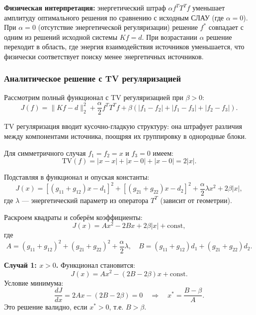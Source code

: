 \documentclass[a4paper,14pt,oneside,openany]{extarticle}
\begin{document}
\textbf{Физическая интерпретация:} энергетический штраф $\alpha f^T T^T f$ уменьшает амплитуду оптимального решения по сравнению с исходным СЛАУ (где $\alpha=0$). 
При $\alpha=0$ (отсутствие энергетической регуляризации) решение $f^*$ совпадает с одним из решений исходной системы $Kf = d$.
При возрастании $\alpha$ решение переходит в область, где энергия взаимодействия источников уменьшается, что физически соответствует поиску менее энергетичных источников.

\subsubsection{Аналитическое решение с TV регуляризацией}

Рассмотрим полный функционал с TV регуляризацией при $\beta > 0$:
\begin{equation}
    J(f) = \|Kf-d\|_2^2 + \frac{\alpha}{2}f^T T^T f + \beta (|f_1-f_2| + |f_1-f_3| + |f_2-f_3|).
\end{equation}

TV регуляризация вводит кусочно-гладкую структуру: она штрафует различия между компонентами источника, поощряя их группировку в однородные блоки.

Для симметричного случая $f_1 = f_2 = x$ и $f_3 = 0$ имеем:
\begin{equation}
    \mathrm{TV}(f) = |x-x| + |x-0| + |x-0| = 2|x|.
\end{equation}

Подставляя в функционал и опуская константы:
\begin{equation}
    J(x) = \left[(g_{11}+g_{12})x - d_1\right]^2 + \left[(g_{21}+g_{22})x - d_2\right]^2 + \frac{\alpha}{2} \lambda x^2 + 2\beta|x|,
\end{equation}
где $\lambda$ — энергетический параметр из оператора $T^T$ (зависит от геометрии).

Раскроем квадраты и соберём коэффициенты:
\begin{equation}
    J(x) = A x^2 - 2B x + 2\beta|x| + \text{const},
\end{equation}
где
\begin{equation}
    A = (g_{11}+g_{12})^2 + (g_{21}+g_{22})^2 + \frac{\alpha}{2} \lambda, \quad B = (g_{11}+g_{12})d_1 + (g_{21}+g_{22})d_2.
\end{equation}

\textbf{Случай 1: $x > 0$.} Функционал становится:
\begin{equation}
    J(x) = A x^2 - (2B - 2\beta) x + \text{const}.
\end{equation}
Условие минимума:
\begin{equation}
    \frac{dJ}{dx} = 2A x - (2B - 2\beta) = 0 \quad \Rightarrow \quad x^* = \frac{B - \beta}{A}.
\end{equation}
Это решение валидно, если $x^* > 0$, т.е. $B > \beta$.
\end{document}
